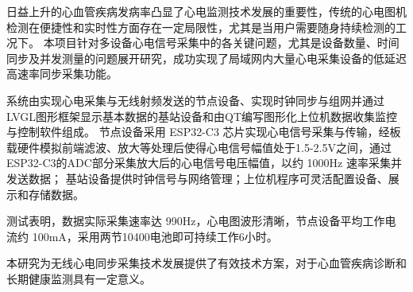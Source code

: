 
{}

\begin{abstractcn}
日益上升的心血管疾病发病率凸显了心电监测技术发展的重要性，传统的心电图机检测在便捷性和实时性方面存在一定局限性，尤其是当用户需要随身持续检测的工况下。
本项目针对多设备心电信号采集中的各关键问题，尤其是设备数量、时间同步及并发测量的问题展开研究，成功实现了局域网内大量心电采集设备的低延迟高速率同步采集功能。

系统由实现心电采集与无线射频发送的节点设备、实现时钟同步与组网并通过LVGL图形框架显示基本数据的基站设备和由QT编写图形化上位机数据收集监控与控制软件组成。
节点设备采用 ESP32-C3 芯片实现心电信号采集与传输，经板载硬件模拟前端滤波、放大等处理后使得心电信号幅值处于1.5-2.5V之间，通过ESP32-C3的ADC部分采集放大后的心电信号电压幅值，以约 1000Hz 速率采集并发送数据；
基站设备提供时钟信号与网络管理；上位机程序可灵活配置设备、展示和存储数据。

测试表明，数据实际采集速率达 990Hz，心电图波形清晰，节点设备平均工作电流约 100mA，采用两节10400电池即可持续工作6小时。

本研究为无线心电同步采集技术发展提供了有效技术方案，对于心血管疾病诊断和长期健康监测具有一定意义。


\end{abstractcn}